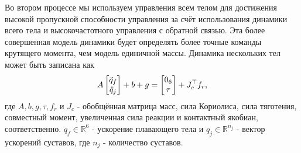 Во втором процессе мы используем управления всем телом для достижения высокой пропускной способности управления за счёт использования динамики всего тела и высокочастотного управления с обратной связью. Эта более совершенная модель динамики будет определять более точные команды крутящего момента, чем модель единичной массы. Динамика нескольких тел может быть записана как
\begin{equation}
	A \begin{bmatrix}
		\ddot{{q}}_f \\ \ddot{{q}}_j
	\end{bmatrix}
	+ b +g =
	\begin{bmatrix}
		0_6 \\ \tau
	\end{bmatrix} +
	J_c^\top f_r,
\end{equation}
где $A, b, g, \tau, f_r $ и $J_c$ - обобщённая матрица масс, сила Кориолиса, сила тяготения, совместный момент, увеличенная сила реакции и контактный якобиан, соответственно. $\ddot{{q}}_f \in \mathbb{R}^{6}$ - ускорение плавающего тела и  $\ddot{{q}}_j \in \mathbb{R}^{n_j}$ - вектор ускорений суставов, где $n_j$ - количество суставов.
\FloatBarrier
